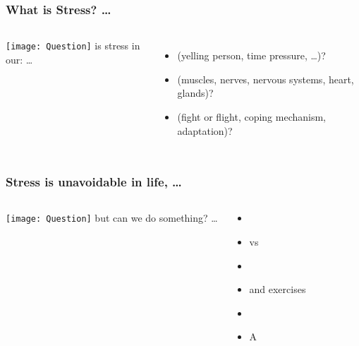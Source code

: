 \documentclass[../main.tex]{subfiles}
\begin{document}
\begin{frame}
  \frametitle{What is Stress? \ldots}
\begin{columns}[c] %
\texttt{[image: Question]}
\pause is stress in our: \ldots \pause
 \begin{itemize}
 \item<3, 6>  (yelling person, time pressure, \ldots)?
 \item<4, 6>   (muscles, nerves, nervous systems, heart, glands)?
 \item<5, 6>   (fight or flight, coping mechanism, adaptation)?
   \end{itemize}
\end{columns}
\end{frame}


\begin{frame}
\frametitle{Stress is unavoidable in life, \ldots}
\begin{columns}[c] %
\texttt{[image: Question]}
\pause but can we do something? \ldots \pause
 \begin{itemize}
 \item<3, 9> 
 \item<4, 9>  vs 
 \item<5, 9>  
 \item<6, 9>  and  exercises
 \item<7, 9> 
 \item<8-9> A  
 \end{itemize}
\end{columns}
\end{frame}
\end{document}
